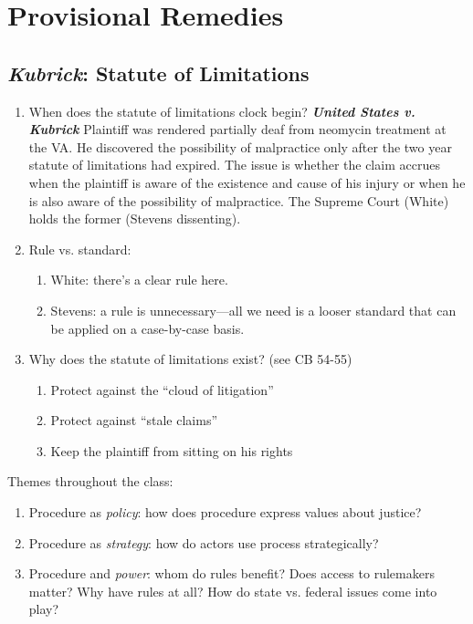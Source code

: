 \section{Provisional Remedies}

\subsection{\emph{Kubrick}: Statute of Limitations}

\begin{enumerate}
    \item When does the statute of limitations clock begin? \textbf{\emph{United States v. Kubrick}} Plaintiff was rendered partially deaf from neomycin treatment at the VA. He discovered the possibility of malpractice only after the two year statute of limitations had expired. The issue is whether the claim accrues when the plaintiff is aware of the existence and cause of his injury or when he is also aware of the possibility of malpractice. The Supreme Court (White) holds the former (Stevens dissenting).
    \item Rule vs. standard:
    \begin{enumerate}
        \item White: there's a clear rule here.
        \item Stevens: a rule is unnecessary---all we need is a looser standard that can be applied on a case-by-case basis.
    \end{enumerate}
    \item Why does the statute of limitations exist? (see CB 54-55)
    \begin{enumerate}
        \item Protect against the ``cloud of litigation''
        \item Protect against ``stale claims''
        \item Keep the plaintiff from sitting on his rights
    \end{enumerate}
\end{enumerate}

Themes throughout the class:

\begin{enumerate}
    \item Procedure as \emph{policy}: how does procedure express values about justice?
    \item Procedure as \emph{strategy}: how do actors use process strategically?
    \item Procedure and \emph{power}: whom do rules benefit? Does access to rulemakers matter? Why have rules at all? How do state vs. federal issues come into play?
\end{enumerate}

